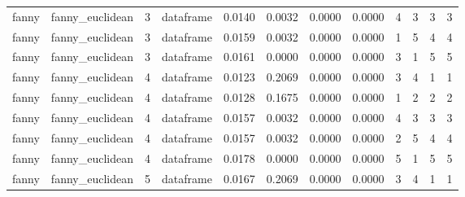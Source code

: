 {\begin{longtable}{| p{1cm} | p{1.8cm} | p{0.7cm} | p{0.9cm} | p{0.5cm} | p{0.65cm} | p{0.5cm} | p{0.5cm} | p{0.55cm} | p{0.55cm} | p{0.6cm} | p{0.5cm} |}
\scriptsize   fanny   & \scriptsize  fanny\_euclidean & \scriptsize    3    & \scriptsize dataframe & \scriptsize    0.0140  &  \scriptsize 0.0032 & \scriptsize 0.0000 & \scriptsize    0.0000 & \scriptsize   4  & \scriptsize    3  & \scriptsize    3  & \scriptsize    3 \\
\scriptsize   fanny   & \scriptsize  fanny\_euclidean & \scriptsize    3    & \scriptsize dataframe & \scriptsize    0.0159  &  \scriptsize 0.0032 & \scriptsize 0.0000 & \scriptsize    0.0000 & \scriptsize   1  & \scriptsize    5  & \scriptsize    4  & \scriptsize    4 \\
\scriptsize   fanny   & \scriptsize  fanny\_euclidean & \scriptsize    3    & \scriptsize dataframe & \scriptsize    0.0161  &  \scriptsize 0.0000 & \scriptsize 0.0000 & \scriptsize    0.0000 & \scriptsize   3  & \scriptsize    1  & \scriptsize    5  & \scriptsize    5 \\
\cline{3-12}
\scriptsize   fanny   & \scriptsize  fanny\_euclidean & \scriptsize    4    & \scriptsize dataframe & \scriptsize    0.0123  &  \scriptsize 0.2069 & \scriptsize 0.0000 & \scriptsize    0.0000 & \scriptsize   3  & \scriptsize    4  & \scriptsize    1  & \scriptsize    1 \\
\scriptsize   fanny   & \scriptsize  fanny\_euclidean & \scriptsize    4    & \scriptsize dataframe & \scriptsize    0.0128  &  \scriptsize 0.1675 & \scriptsize 0.0000 & \scriptsize    0.0000 & \scriptsize   1  & \scriptsize    2  & \scriptsize    2  & \scriptsize    2 \\
\scriptsize   fanny   & \scriptsize  fanny\_euclidean & \scriptsize    4    & \scriptsize dataframe & \scriptsize    0.0157  &  \scriptsize 0.0032 & \scriptsize 0.0000 & \scriptsize    0.0000 & \scriptsize   4  & \scriptsize    3  & \scriptsize    3  & \scriptsize    3 \\
\scriptsize   fanny   & \scriptsize  fanny\_euclidean & \scriptsize    4    & \scriptsize dataframe & \scriptsize    0.0157  &  \scriptsize 0.0032 & \scriptsize 0.0000 & \scriptsize    0.0000 & \scriptsize   2  & \scriptsize    5  & \scriptsize    4  & \scriptsize    4 \\
\scriptsize   fanny   & \scriptsize  fanny\_euclidean & \scriptsize    4    & \scriptsize dataframe & \scriptsize    0.0178  &  \scriptsize 0.0000 & \scriptsize 0.0000 & \scriptsize    0.0000 & \scriptsize   5  & \scriptsize    1  & \scriptsize    5  & \scriptsize    5 \\
\cline{3-12}
\scriptsize   fanny   & \scriptsize  fanny\_euclidean & \scriptsize    5    & \scriptsize dataframe & \scriptsize    0.0167  &  \scriptsize 0.2069 & \scriptsize 0.0000 & \scriptsize    0.0000 & \scriptsize   3  & \scriptsize    4  & \scriptsize    1  & \scriptsize    1 \\

\end{longtable}}
